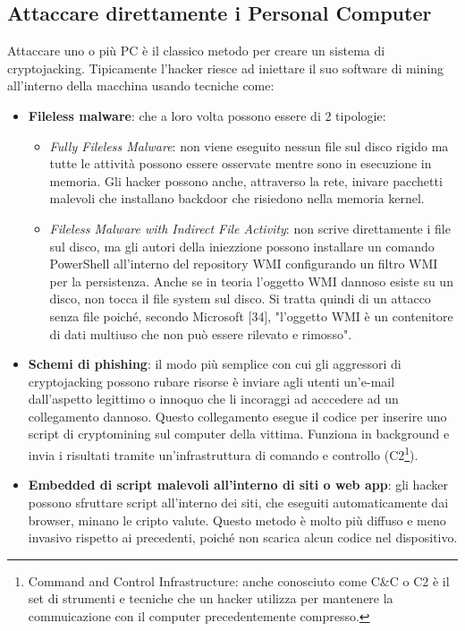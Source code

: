\documentclass[12pt,a4paper]{article}
\begin{document}
\subsection{Attaccare direttamente i Personal Computer}
Attaccare uno o più PC è il classico metodo per creare un sistema di
cryptojacking. Tipicamente l'hacker riesce ad iniettare il suo software di
mining all'interno della macchina usando tecniche come:
\begin{itemize}
    \item \textbf{Fileless malware}: che a loro volta possono essere di 2 tipologie:
    \begin{itemize}
        \item \textit{Fully Fileless Malware}: non viene eseguito nessun file
        sul disco rigido ma tutte le attività possono essere osservate mentre
        sono in esecuzione in memoria. Gli hacker possono anche, attraverso la
        rete, inivare pacchetti malevoli che installano backdoor che risiedono
        nella memoria kernel.
        \item \textit{Fileless Malware with Indirect File Activity}: non scrive
        direttamente i file sul disco, ma gli autori della iniezzione possono
        installare un comando PowerShell all'interno del repository WMI
        configurando un filtro WMI per la persistenza. Anche se in teoria
        l'oggetto WMI dannoso esiste su un disco, non tocca il file system sul
        disco. Si tratta quindi di un attacco senza file poiché, secondo
        Microsoft [34], "l'oggetto WMI è un contenitore di dati multiuso che non
        può essere rilevato e rimosso".\cite{FMW}
    \end{itemize}
    \item \textbf{Schemi di phishing}: il modo più semplice con cui gli
        aggressori di cryptojacking possono rubare risorse è inviare agli utenti
        un'e-mail dall'aspetto legittimo o innoquo che li incoraggi ad acccedere
        ad un collegamento dannoso. Questo collegamento esegue il codice per
        inserire uno script di cryptomining sul computer della vittima. Funziona
        in background e invia i risultati tramite un'infrastruttura di comando e
        controllo (C2\footnote{Command and Control Infrastructure: anche
        conosciuto come C\&C o C2 è il set di strumenti e tecniche che un hacker utilizza per mantenere la commuicazione con il computer
        precedentemente compresso.}).
    \item \textbf{Embedded di script malevoli all'interno di siti o web app}: gli
        hacker possono sfruttare script all'interno dei siti, che eseguiti
        automaticamente dai browser, minano le cripto valute. Questo metodo è
        molto più diffuso e meno invasivo rispetto ai precedenti, poiché non
        scarica alcun codice nel dispositivo.
\end{itemize}
\end{document}
